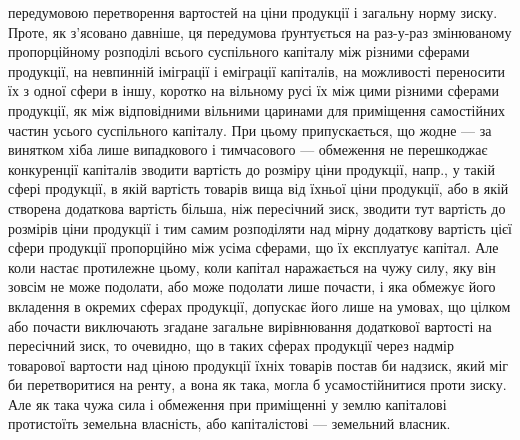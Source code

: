 \parcont{}  %
передумовою перетворення вартостей на ціни продукції і загальну норму зиску. Проте, як з’ясовано
давніше, ця передумова ґрунтується на раз-у-раз змінюваному пропорційному розподілі всього
суспільного капіталу між різними сферами продукції, на невпинній іміграції і еміграції капіталів, на
можливості переносити їх з одної сфери в іншу, коротко на вільному русі їх між цими різними сферами
продукції, як між відповідними вільними
царинами для приміщення самостійних частин усього суспільного капіталу. При цьому припускається, що
жодне — за винятком хіба лише випадкового і тимчасового — обмеження не перешкоджає конкуренції
капіталів зводити вартість до розміру ціни продукції, напр., у такій сфері продукції, в якій
вартість товарів вища від їхньої ціни продукції, або в якій створена додаткова вартість більша, ніж
пересічний зиск, зводити тут вартість до розмірів ціни продукції і тим самим розподіляти над мірну
додаткову вартість цієї сфери продукції пропорційно між усіма сферами,
що їх експлуатує капітал. Але коли настає протилежне цьому, коли капітал
наражається на чужу силу, яку він зовсім не може подолати, або може подолати
лише почасти, і яка обмежує його вкладення в окремих сферах продукції,
допускає його лише на умовах, що цілком або почасти виключають
згадане загальне вирівнювання додаткової вартості на пересічний зиск, то очевидно, що в таких сферах
продукції через надмір товарової вартости над ціною продукції їхніх товарів постав би надзиск, який
міг би перетворитися на ренту, а вона як така, могла б усамостійнитися проти зиску. Але як така чужа
сила і обмеження при приміщенні у землю капіталові протистоїть земельна власність, або капіталістові
— земельний власник.

